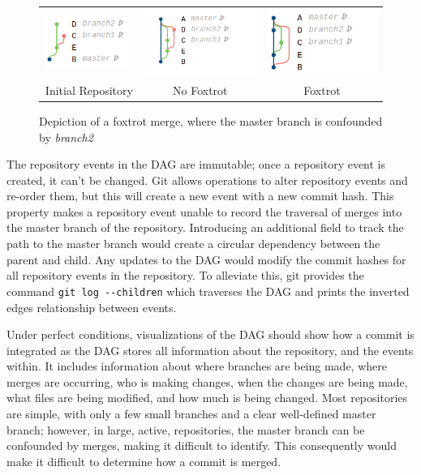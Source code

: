 \begin{figure}[htpb]
  \centering
  \begin{tabular}{ccc}
    \includegraphics[width=114px]{Figures/background/foxtrot_initial.png} &
    \includegraphics[width=145px]{Figures/background/foxtrot_good.png} &
    \includegraphics[width=145px]{Figures/background/foxtrot_bad.png} \\
    Initial Repository & No Foxtrot & Foxtrot
  \end{tabular}
  \caption{Depiction of a foxtrot merge, where the master branch is
    confounded by \emph{branch2}}
  \label{fig:foxtrot_steps}
\end{figure}

The repository events in the DAG are immutable; once a repository event
is created, it can't be changed. Git allows operations to alter
repository events and re-order them, but this will create a new event
with a new commit hash. This property makes a repository event unable to
record the traversal of merges into the master branch of the repository.
Introducing an additional field to track the path to the master branch
would create a circular dependency between the parent and child. Any
updates to the DAG would modify the commit hashes for all repository
events in the repository. To alleviate this, git provides the command
\verb|git log --children| which traverses the DAG and prints the
inverted edges relationship between events.

Under perfect conditions, visualizations of the DAG should show how a
commit is integrated as the DAG stores all information about the
repository, and the events within. It includes information about where
branches are being made, where merges are occurring, who is making
changes, when the changes are being made, what files are being modified,
and how much is being changed. Most repositories are simple, with only a
few small branches and a clear well-defined master branch; however, in
large, active, repositories, the master branch can be confounded by
\foxtrot{} merges, making it difficult to identify. This consequently
would make it difficult to determine how a commit is merged.
